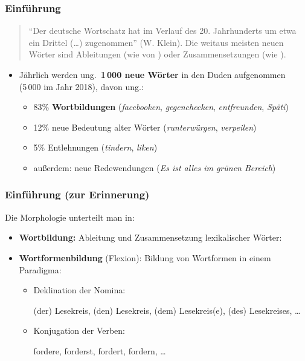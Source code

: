 \begin{frame}
\frametitle{Einführung}


\begin{quote}
``Der deutsche Wortschatz hat im Verlauf des 20. Jahrhunderts um etwa ein Drittel (\dots ) zugenommen'' (W. Klein). Die weitaus meisten neuen Wörter sind Ableitungen (wie  von ) oder Zusammensetzungen (wie ).
\end{quote}
\hfill \citep{Heine14a}

\medskip 

\begin{itemize}
\item Jährlich werden ung.\ \textbf{1\,000 neue Wörter} in den Duden aufgenommen \\
(5\,000 im Jahr 2018), davon ung.:

\begin{itemize}
	\item 83\% \textbf{Wortbildungen} (\zB \emph{facebooken}, \emph{gegenchecken}, \emph{entfreunden}, \emph{Späti})
	\item 12\% neue Bedeutung alter Wörter (\zB \emph{runterwürgen}, \emph{verpeilen})
	\item 5\% Entlehnungen (\zB \emph{tindern}, \emph{liken})
	\item außerdem: neue Redewendungen (\zB \emph{Es ist alles im grünen Bereich})
\end{itemize}

\end{itemize}

\end{frame}


\begin{frame}
\frametitle{Einführung (zur Erinnerung)}

Die Morphologie unterteilt man in:
	
	\begin{itemize}
		\item \textbf{Wortbildung:} Ableitung und Zusammensetzung lexikalischer Wörter:
		
		\eal 
		\zl
		
		\item \textbf{Wortformenbildung} (Flexion): Bildung von Wortformen in einem Paradigma: 
		
		\begin{itemize}
			\item Deklination der Nomina: 
			
			\ea (der) Lesekreis, (den) Lesekreis, (dem) Lesekreis(e), (des) Lesekreises, \ldots
			\z 
			
			\item Konjugation der Verben: 
			
			\ea fordere, forderst, fordert, fordern, \ldots 
			\z 
		\end{itemize}	
	\end{itemize}	

\end{frame}


